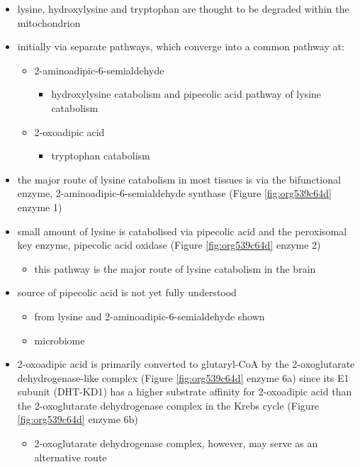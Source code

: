 \documentclass{scrartcl}
\begin{document}
\begin{itemize}
\item lysine, hydroxylysine and tryptophan are thought to be degraded
within the mitochondrion
\item initially via separate pathways, which converge into a common 
pathway at:
\begin{itemize}
\item 2-aminoadipic-6-semialdehyde
\begin{itemize}
\item hydroxylysine catabolism and pipecolic acid pathway of lysine
catabolism
\end{itemize}
\item 2-oxoadipic acid
\begin{itemize}
\item tryptophan catabolism
\end{itemize}
\end{itemize}
\item the major route of lysine catabolism in most tissues is via the
bifunctional enzyme, 2-aminoadipic-6-semialdehyde synthase (Figure \ref{fig:org539c64d} enzyme 1)
\item small amount of lysine is catabolised via pipecolic acid and the
peroxisomal key enzyme, pipecolic acid oxidase (Figure \ref{fig:org539c64d} enzyme 2)
\begin{itemize}
\item this pathway is the major route of lysine catabolism in the
brain
\end{itemize}
\item source of pipecolic acid is not yet fully understood
\begin{itemize}
\item from lysine and 2-aminoadipic-6-semialdehyde shown
\item microbiome
\end{itemize}

\item 2-oxoadipic acid is primarily converted to glutaryl-CoA by the
2-oxoglutarate dehydrogenase-like complex (Figure \ref{fig:org539c64d} enzyme 6a)
since its E1 subunit (DHT-KD1) has a higher substrate affinity for
2-oxoadipic acid than the 2-oxoglutarate dehydrogenase complex in
the Krebs cycle (Figure \ref{fig:org539c64d} enzyme 6b)

\begin{itemize}
\item 2-oxoglutarate dehydrogenase complex, however, may serve as an
alternative route


\end{itemize}
\end{itemize}
\end{document}
